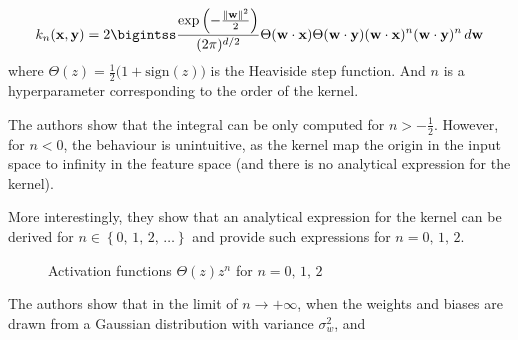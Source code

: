 \begin{equation}
    k_n(\x, \y) = 2 \bigintss \frac{\exp\left(-\frac{\lVert \textbf w \rVert^2}{2}\right)}{(2\pi)^{d/2}}
        \Theta(\textbf w \cdot \x) \Theta(\textbf w \cdot \y) (\textbf w \cdot \x)^n (\textbf w \cdot \y)^n \,d\textbf w
\end{equation}
where $\Theta(z) = \frac{1}{2} \bigl(1 + \text{sign}(z)\bigr)$ is the Heaviside step function.
And $n$ is a hyperparameter corresponding to the order of the kernel.

The authors show that the integral can be only computed for $n > -\frac{1}{2}$.
However, for $n < 0$, the behaviour is unintuitive, as the kernel map the origin
in the input space to infinity in the feature space (and there is no analytical
expression for the kernel).

More interestingly, they show that an analytical expression for the
kernel can be derived for $n \in \left\{ 0,\,1,\,2,\,\dots \right\}$
and provide such expressions for $n = 0,\,1,\,2$.

\begin{figure}[H]
	\caption{Activation functions $\Theta(z)z^n$ for $n = 0,\,1,\,2$}
\end{figure}
The authors show that in the limit of $n \to +\infty$,
when the weights and biases are drawn from a Gaussian distribution with variance $\sigma_w^2$, and

